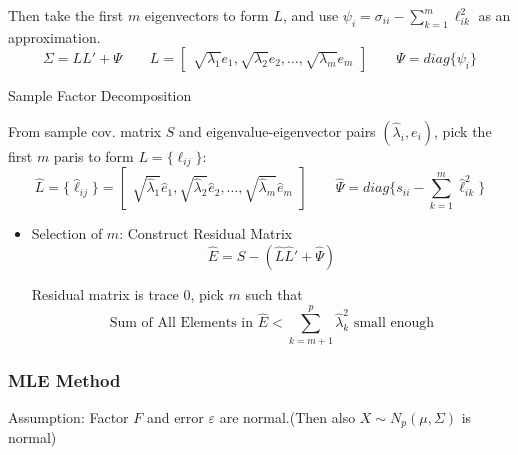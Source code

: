     Then take the first $ m $ eigenvectors to form $ L $, and use $ \psi _i=\sigma  _{ii}-\sum\limits_{k=1}^m\ell_{ik}^2$ as an approximation.
    \begin{equation}
        \Sigma =LL'+\Psi \qquad L=\begin{bmatrix}
            \sqrt{\lambda_1 }e_1,\sqrt{\lambda_2 }e_2,\ldots,\sqrt{\lambda _m}e_m
        \end{bmatrix} \qquad \Psi =diag\{\psi _{i}\}
    \end{equation}

    \begin{point}
        Sample Factor Decomposition
    \end{point}

    From sample cov. matrix $ S $ and eigenvalue-eigenvector pairs $ (\hat{\lambda }_i,e_i) $, pick the first $ m $ paris to form $ L=\{\ell_{ij}\} $:
    \begin{equation}
        \hat{L}=\{\hat{\ell}_{ij}\}=\begin{bmatrix}
            \sqrt{\hat{\lambda }_1}\hat{e}_1,\sqrt{\hat{\lambda }_2}\hat{e}_2,\ldots,\sqrt{\hat{\lambda }_m}\hat{e}_m
        \end{bmatrix} 
        \qquad
        \hat{\Psi }=diag\{s_{ii}-\sum_{k=1}^m\hat{\ell}_{ik}^2\}
    \end{equation}

    \begin{itemize}[topsep=2pt,itemsep=2pt]
        \item Selection of $ m $: Construct Residual Matrix
        \begin{equation}
            \hat{E}=S-(\hat{L}\hat{L}'+\hat{\Psi }) 
        \end{equation}
        
        Residual matrix is trace $ 0 $, pick $ m $ such that
        \begin{equation}
            \text{Sum of All Elements in }\hat{E}<\sum_{k=m+1}^p\hat{\lambda }_{k}^2\text{ small enough} 
        \end{equation}
        
        
        
    \end{itemize}
    
        
    
    
    
    
    
\subsubsection{MLE Method}
    Assumption: Factor $ F $ and error $ \varepsilon  $ are normal.(Then also $ X \sim N_p(\mu ,\Sigma )$ is normal)
    
